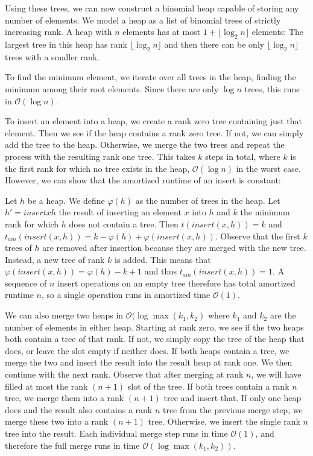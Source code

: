 Using these trees, we can now construct a binomial heap capable of storing any number of elements. We model a heap as a list of binomial trees of strictly increasing rank. A heap with $n$ elements has at most $1 + \lfloor \log_2 n \rfloor$ elements: The largest tree in this heap has rank $\lfloor \log_2 n \rfloor$ and then there can be only $\lfloor \log_2 n \rfloor$ trees with a smaller rank.

To find the minimum element, we iterate over all trees in the heap, finding the minimum among their root elements. Since there are only $\log n$ trees, this runs in $\mathcal O(\log n)$.

To insert an element into a heap, we create a rank zero tree containing just that element. Then we see if the heap contains a rank zero tree. If not, we can simply add the tree to the heap. Otherwise, we merge the two trees and repeat the process with the resulting rank one tree. This takes $k$ steps in total, where $k$ is the first rank for which no tree exists in the heap, $\mathcal O(\log n)$ in the worst case. However, we can show that the amortized runtime of an insert is constant:

Let $h$ be a heap. We define $\varphi(h)$ as the number of trees in the heap. Let $h' = insert x h$ the result of inserting an element $x$ into $h$ and $k$ the minimum rank for which $h$ does not contain a tree. Then $t(insert(x, h)) = k$ and $t_{am}(insert(x, h)) = k - \varphi(h) + \varphi(insert(x, h))$. Observe that the first $k$ trees of $h$ are removed after insertion because they are merged with the new tree. Instead, a new tree of rank $k$ is added. This means that $\varphi(insert(x, h)) = \varphi(h) - k + 1$ and thus $t_{am}(insert(x, h)) = 1$. A sequence of $n$ insert operations on an empty tree therefore has total amortized runtime $n$, so a single operation runs in amortized time $\mathcal O(1)$.

We can also merge two heaps in $\mathcal O(\log \max(k_1, k_2)$ where $k_1$ and $k_2$ are the number of elements in either heap. Starting at rank zero, we see if the two heaps both contain a tree of that rank. If not, we simply copy the tree of the heap that does, or leave the slot empty if neither does. If both heaps contain a tree, we merge the two and insert the result into the result heap at rank one. We then continue with the next rank. Observe that after merging at rank $n$, we will have filled at most the rank $(n+1)$ slot of the tree. If both trees contain a rank $n$ tree, we merge them into a rank $(n+1)$ tree and insert that. If only one heap does and the result also contains a rank $n$ tree from the previous merge step, we merge these two into a rank $(n+1)$ tree. Otherwise, we insert the single rank $n$ tree into the result. Each individual merge step runs in time $\mathcal O(1)$, and therefore the full merge runs in time $\mathcal O(\log \max(k_1, k_2))$.

